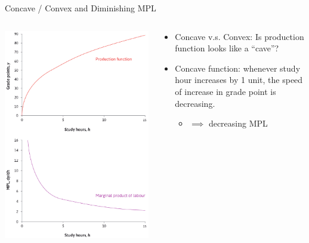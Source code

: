 \documentclass{beamer}
\begin{document}
\begin{frame}[t]{Concave / Convex and Diminishing MPL}
    \begin{columns}
	\begin{column}{0.37\textwidth}
	    \centering
	    \includegraphics[width=\textwidth]{./figures/production-3.png}
        \end{column}
	\begin{column}{0.63\textwidth}
	    \begin{itemize}
	        \item Concave v.s. Convex: Is production function looks like a ``cave''?
		\item Concave function: whenever study hour increases by 1 unit, the speed of increase in grade point is decreasing.
		\begin{itemize}
		    \item  $\implies $ decreasing MPL
		\end{itemize}
	    \end{itemize}
	\end{column}
    \end{columns}
\end{frame}
\end{document}
